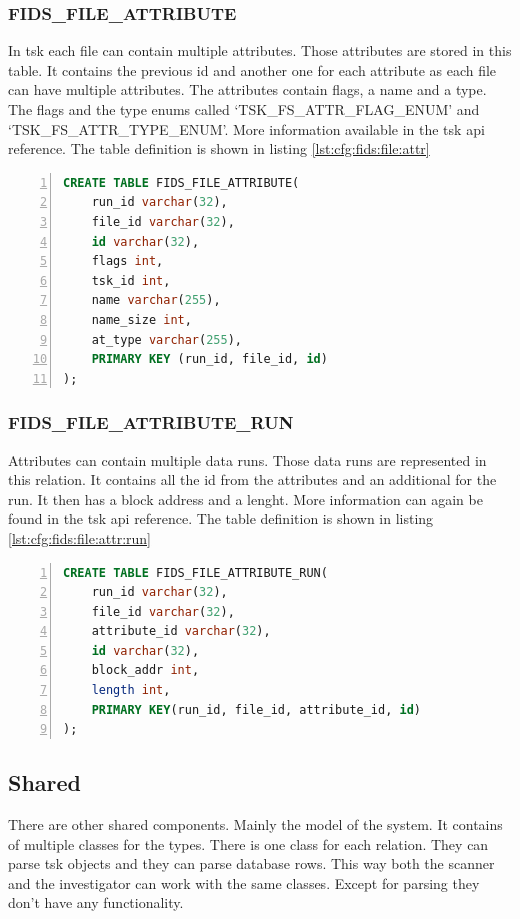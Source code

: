 \subsubsection{FIDS\_FILE\_ATTRIBUTE}

In \gls{tsk} each file can contain multiple attributes. Those attributes are stored in this table. It contains the previous \gls{id} and another one for each attribute as each file can have multiple attributes. The attributes contain flags, a name and a type. The flags and the type enums called `TSK\_FS\_ATTR\_FLAG\_ENUM' and `TSK\_FS\_ATTR\_TYPE\_ENUM'. More information available in the \gls{tsk} \gls{api} reference. \cite{tsk:attr:struct,tsk:file:header} The table definition is shown in listing \ref{lst:cfg:fids:file:attr}

\begin{lstlisting}[language=sql, numbers=left, caption=Fids File Attribute Table Definition, label=lst:cfg:fids:file:attr]
CREATE TABLE FIDS_FILE_ATTRIBUTE(
	run_id varchar(32),
	file_id varchar(32),
	id varchar(32),
	flags int,
	tsk_id int,
	name varchar(255),
	name_size int,
	at_type varchar(255), 
	PRIMARY KEY (run_id, file_id, id)
);
\end{lstlisting}

\subsubsection{FIDS\_FILE\_ATTRIBUTE\_RUN}

Attributes can contain multiple data runs. Those data runs are represented in this relation. It contains all the \gls{id} from the attributes and an additional for the run. It then has a block address and a lenght. More information can again be found in the \gls{tsk} \gls{api} reference. \cite{tsk:attr:run:struct} The table definition is shown in listing \ref{lst:cfg:fids:file:attr:run}

\begin{lstlisting}[language=sql, numbers=left, caption=Fids File Attribute Run Table Definition, label=lst:cfg:fids:file:attr:run]
CREATE TABLE FIDS_FILE_ATTRIBUTE_RUN(
	run_id varchar(32),
	file_id varchar(32),
	attribute_id varchar(32), 
	id varchar(32), 
	block_addr int, 
	length int, 
	PRIMARY KEY(run_id, file_id, attribute_id, id) 
);
\end{lstlisting}

\subsection{Shared}

There are other shared components. Mainly the model of the system. It contains of multiple classes for the types. There is one class for each relation. They can parse \gls{tsk} objects and they can parse database rows. This way both the scanner and the investigator can work with the same classes. Except for parsing they don't have any functionality.

